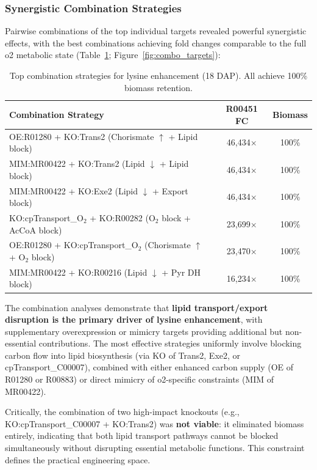 \subsubsection{Synergistic Combination Strategies}

Pairwise combinations of the top individual targets revealed powerful synergistic effects, with the best combinations achieving fold changes comparable to the full o2 metabolic state (Table~\ref{tab:combos}; Figure~\ref{fig:combo_targets}):

\begin{table}[H]
\centering
\caption{Top combination strategies for lysine enhancement (18 DAP). All achieve 100\% biomass retention.}
\label{tab:combos}
\small
\begin{tabular}{lcc}
\toprule
Combination Strategy & R00451 FC & Biomass \\
\midrule
OE:R01280 + KO:Trans2 (Chorismate $\uparrow$ + Lipid block) & 46,434$\times$ & 100\% \\
MIM:MR00422 + KO:Trans2 (Lipid $\downarrow$ + Lipid block) & 46,434$\times$ & 100\% \\
MIM:MR00422 + KO:Exe2 (Lipid $\downarrow$ + Export block) & 46,434$\times$ & 100\% \\
KO:cpTransport\_O$_2$ + KO:R00282 (O$_2$ block + AcCoA block) & 23,699$\times$ & 100\% \\
OE:R01280 + KO:cpTransport\_O$_2$ (Chorismate $\uparrow$ + O$_2$ block) & 23,470$\times$ & 100\% \\
MIM:MR00422 + KO:R00216 (Lipid $\downarrow$ + Pyr DH block) & 16,234$\times$ & 100\% \\
\bottomrule
\end{tabular}
\end{table}

The combination analyses demonstrate that \textbf{lipid transport/export disruption is the primary driver of lysine enhancement}, with supplementary overexpression or mimicry targets providing additional but non-essential contributions. The most effective strategies uniformly involve blocking carbon flow into lipid biosynthesis (via KO of Trans2, Exe2, or cpTransport\_C00007), combined with either enhanced carbon supply (OE of R01280 or R00883) or direct mimicry of o2-specific constraints (MIM of MR00422).

Critically, the combination of two high-impact knockouts (e.g., KO:cpTransport\_C00007 + KO:Trans2) was \textbf{not viable}: it eliminated biomass entirely, indicating that both lipid transport pathways cannot be blocked simultaneously without disrupting essential metabolic functions. This constraint defines the practical engineering space.

